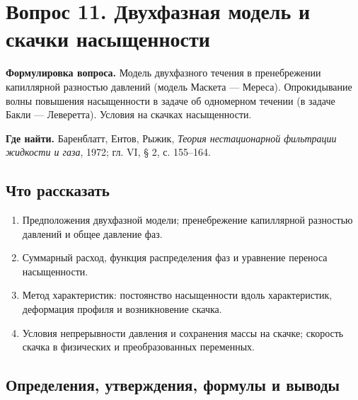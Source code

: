 \documentclass[12pt,a4paper]{article}
\newcounter{questionnumber}
\begin{document}
\clearpage
\setcounter{questionnumber}{11}
\setcounter{equation}{0}
\setcounter{footnote}{0}
\section*{Вопрос 11. Двухфазная модель и скачки насыщенности}
\textbf{Формулировка вопроса.} Модель двухфазного течения в пренебрежении капиллярной разностью давлений (модель Маскета — Мереса). Опрокидывание волны повышения насыщенности в задаче об одномерном течении (в задаче Бакли — Леверетта). Условия на скачках насыщенности.

\medskip
\textbf{Где найти.} Баренблатт, Ентов, Рыжик, \textit{Теория нестационарной фильтрации жидкости и газа}, 1972; гл. VI, § 2, с. 155--164.

\subsection*{Что рассказать}
\begin{enumerate}
\item Предположения двухфазной модели; пренебрежение капиллярной разностью давлений и общее давление фаз.
\item Суммарный расход, функция распределения фаз и уравнение переноса насыщенности.
\item Метод характеристик: постоянство насыщенности вдоль характеристик, деформация профиля и возникновение скачка.
\item Условия непрерывности давления и сохранения массы на скачке; скорость скачка в физических и преобразованных переменных.
\end{enumerate}
\subsection*{Определения, утверждения, формулы и выводы}
\begingroup
\end{document}
